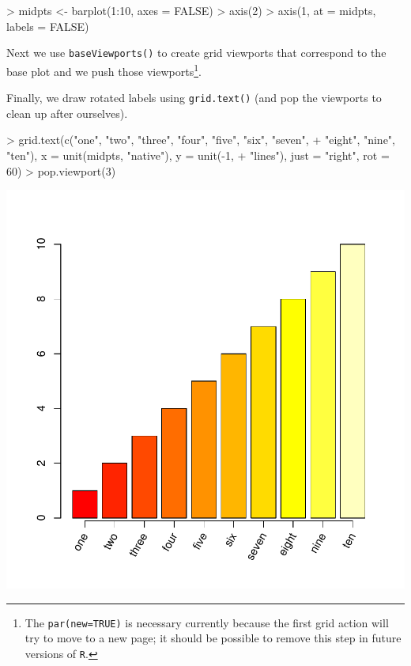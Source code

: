 \documentclass[a4paper]{article}
\newcommand{\R}{{\tt R}}
\begin{document}
\begin{Schunk}
\begin{Sinput}
> midpts <- barplot(1:10, axes = FALSE)
> axis(2)
> axis(1, at = midpts, labels = FALSE)
\end{Sinput}
\end{Schunk}
Next we  use \verb|baseViewports()| to 
create grid viewports that correspond to the base plot and we push
those viewports\footnote{The {\tt par(new=TRUE)}
is necessary currently because the first grid action will
try to move to a new page;  it should be possible to remove
this step in future versions of \R{}.}.

\begin{Schunk}
\end{Schunk}
Finally, we draw rotated labels using 
\verb|grid.text()| (and pop the viewports to clean up after ourselves).

\begin{Schunk}
\begin{Sinput}
> grid.text(c("one", "two", "three", "four", "five", "six", "seven", 
+     "eight", "nine", "ten"), x = unit(midpts, "native"), y = unit(-1, 
+     "lines"), just = "right", rot = 60)
> pop.viewport(3)
\end{Sinput}
\end{Schunk}
\includegraphics{gridBase-005}
\end{document}
